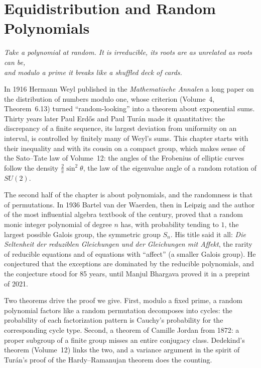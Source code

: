 \chapter{Equidistribution and Random Polynomials}\label{ch:polynomials}
\begin{center}\itshape
Take a polynomial at random. It is irreducible, its roots are as unrelated as roots can be,\\
and modulo a prime it breaks like a shuffled deck of cards.
\end{center}

In 1916 Hermann Weyl published in the \emph{Mathematische Annalen} a long paper on the distribution of numbers modulo one, whose criterion (Volume~4, Theorem~6.13) turned ``random-looking'' into a theorem about exponential sums. Thirty years later Paul Erd\H{o}s and Paul Turán made it quantitative: the discrepancy of a finite sequence, its largest deviation from uniformity on an interval, is controlled by finitely many of Weyl's sums. This chapter starts with their inequality and with its cousin on a compact group, which makes sense of the Sato--Tate law of Volume~12: the angles of the Frobenius of elliptic curves follow the density $\frac2\pi\sin^2\theta$, the law of the eigenvalue angle of a random rotation of $SU(2)$.

The second half of the chapter is about polynomials, and the randomness is that of permutations. In 1936 Bartel van der Waerden, then in Leipzig and the author of the most influential algebra textbook of the century, proved that a random monic integer polynomial of degree $n$ has, with probability tending to $1$, the largest possible Galois group, the symmetric group $S_n$. His title said it all: \emph{Die Seltenheit der reduziblen Gleichungen und der Gleichungen mit Affekt}, the rarity of reducible equations and of equations with ``affect'' (a smaller Galois group). He conjectured that the exceptions are dominated by the reducible polynomials, and the conjecture stood for 85 years, until Manjul Bhargava proved it in a preprint of 2021.

Two theorems drive the proof we give. First, modulo a fixed prime, a random polynomial factors like a random permutation decomposes into cycles: the probability of each factorization pattern is Cauchy's probability for the corresponding cycle type. Second, a theorem of Camille Jordan from 1872: a proper subgroup of a finite group misses an entire conjugacy class. Dedekind's theorem (Volume~12) links the two, and a variance argument in the spirit of Turán's proof of the Hardy--Ramanujan theorem does the counting.

